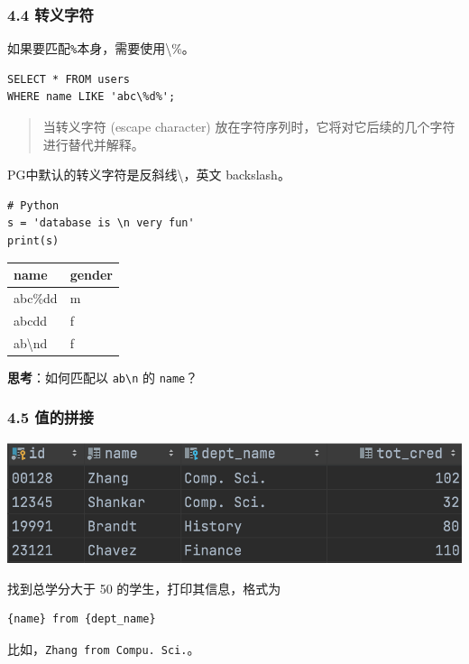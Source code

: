 \documentclass[aspectratio=169, 14pt]{beamer}
\begin{document}
\begin{frame}[fragile]
    \frametitle{4.4 转义字符}
如果要匹配\texttt{\%}本身，需要使用\alert{\textbackslash\%}。
\begin{verbatim} 
SELECT * FROM users
WHERE name LIKE 'abc\%d%';
\end{verbatim}
\begin{quote}
    当\alert{转义字符} (escape character) 放在字符序列时，它将对它后续的几个字符进行替代并解释。
\end{quote}

PG中默认的转义字符是反斜线\textbackslash，英文 backslash。
\end{frame}

\begin{frame}[fragile]
    \begin{verbatim} 
# Python
s = 'database is \n very fun'
print(s)
    \end{verbatim}
    \pause
    \begin{table}
        \begin{tabular}{ll}
          \toprule
          name & gender \\
          \midrule
          abc\%dd & m \\
          abcdd & f \\
          ab\textbackslash nd & f \\
          \bottomrule
        \end{tabular}
    \end{table}
{\large {}} \textbf{思考}：如何匹配以 \texttt{ab\textbackslash n} 的 \texttt{name}？
\end{frame}

\begin{frame}[fragile]
    \frametitle{4.5 值的拼接}
\includegraphics[width=.8\textwidth]{week4/cred}    

找到总学分大于 50 的学生，打印其信息，格式为

\begin{verbatim}
{name} from {dept_name}    
\end{verbatim}

比如，\texttt{Zhang from Compu. Sci.}。
\end{frame}
\end{document}
